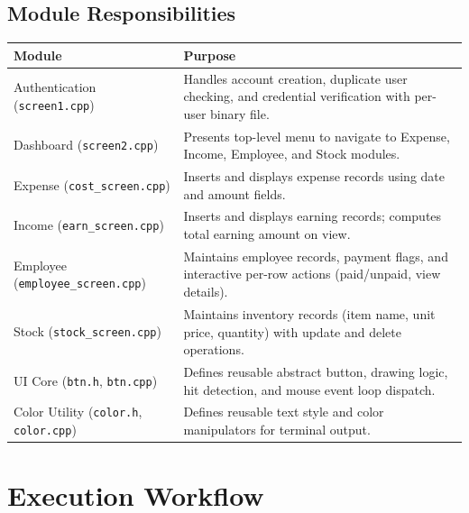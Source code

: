 \documentclass[12pt,a4paper]{article}
\begin{document}
\subsection{Module Responsibilities}
\begin{longtable}{|p{4cm}|p{10cm}|}
\hline
\rowcolor{lightbg}
\textbf{Module} & \textbf{Purpose} \\
\hline
Authentication (\texttt{screen1.cpp}) & Handles account creation, duplicate user checking, and credential verification with per-user binary file. \\
\hline
Dashboard (\texttt{screen2.cpp}) & Presents top-level menu to navigate to Expense, Income, Employee, and Stock modules. \\
\hline
Expense (\texttt{cost\_screen.cpp}) & Inserts and displays expense records using date and amount fields. \\
\hline
Income (\texttt{earn\_screen.cpp}) & Inserts and displays earning records; computes total earning amount on view. \\
\hline
Employee (\texttt{employee\_screen.cpp}) & Maintains employee records, payment flags, and interactive per-row actions (paid/unpaid, view details). \\
\hline
Stock (\texttt{stock\_screen.cpp}) & Maintains inventory records (item name, unit price, quantity) with update and delete operations. \\
\hline
UI Core (\texttt{btn.h}, \texttt{btn.cpp}) & Defines reusable abstract button, drawing logic, hit detection, and mouse event loop dispatch. \\
\hline
Color Utility (\texttt{color.h}, \texttt{color.cpp}) & Defines reusable text style and color manipulators for terminal output. \\
\hline
\end{longtable}

\section{Execution Workflow}
\end{document}
